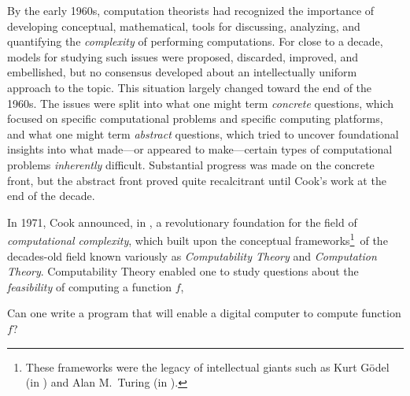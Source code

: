 {By the early 1960s, computation theorists had recognized the importance of developing conceptual, mathematical, tools for discussing, analyzing, and quantifying the {\em complexity} of performing computations.  For close to a decade, models for studying such issues were proposed, discarded, improved, and embellished, but no consensus developed about an intellectually uniform approach to the topic.  This situation largely changed toward the end of the 1960s.  The issues were split into what one might term {\em concrete} questions, which focused on specific computational problems and specific computing platforms, and what one might term {\em abstract} questions, which tried to uncover foundational insights into what made---or appeared to make---certain types of computational problems {\em inherently} difficult.  Substantial progress was made on the concrete front, but the abstract front proved quite recalcitrant until Cook's work at the end of the decade.

\medskip

 
In 1971, Cook announced, in \cite{Cook71}, a revolutionary foundation for the field of {\it computational complexity}, which built upon the conceptual frameworks\footnote{These frameworks were the legacy of intellectual giants such as Kurt G\"{o}del (in \cite{Goedel31}) and Alan M.~Turing (in \cite{Turing36}).}~of the decades-old field known variously as {\it Computability Theory}  and {\it Computation Theory}.   Computability Theory enabled one to study questions about the {\em feasibility} of computing a function $f$,

\smallskip

\noindent
Can one write a program that will enable a digital computer to compute function $f$?

\smallskip


}
